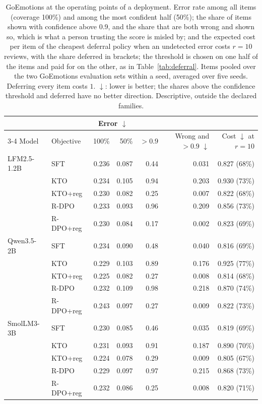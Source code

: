 \begin{table}[t]
\centering
\caption{GoEmotions at the operating points of a deployment. Error rate among all items (coverage 100\%) and among the most confident half (50\%); the share of items shown with confidence above 0.9, and the share that are both wrong and shown so, which is what a person trusting the score is misled by; and the expected cost per item of the cheapest deferral policy when an undetected error costs $r = 10$ reviews, with the share deferred in brackets; the threshold is chosen on one half of the items and paid for on the other, as in Table~\ref{tab:deferral}. Items pooled over the two GoEmotions evaluation sets within a seed, averaged over five seeds. Deferring every item costs $1$. $\downarrow$: lower is better; the shares above the confidence threshold and deferred have no better direction. Descriptive, outside the declared families.}
\label{tab:goemo-operating}
\footnotesize
\setlength{\tabcolsep}{4pt}
\begin{tabular}{llrrrrr}
\toprule
& & \multicolumn{2}{c}{Error $\downarrow$} & & & \\ \cmidrule(lr){3-4}
Model & Objective & 100\% & 50\% & $>0.9$ & Wrong and $>0.9$ $\downarrow$ & Cost $\downarrow$ at $r = 10$ \\
\midrule
LFM2.5-1.2B & SFT & 0.236 & 0.087 & 0.44 & 0.031 & 0.827 (68\%) \\
 & KTO & 0.234 & 0.105 & 0.94 & 0.203 & 0.930 (73\%) \\
 & KTO+reg & 0.230 & 0.082 & 0.25 & 0.007 & 0.822 (68\%) \\
 & R-DPO & 0.233 & 0.093 & 0.96 & 0.209 & 0.856 (73\%) \\
 & R-DPO+reg & 0.230 & 0.084 & 0.17 & 0.002 & 0.823 (69\%) \\
\addlinespace
Qwen3.5-2B & SFT & 0.234 & 0.090 & 0.48 & 0.040 & 0.816 (69\%) \\
 & KTO & 0.229 & 0.103 & 0.89 & 0.176 & 0.925 (77\%) \\
 & KTO+reg & 0.225 & 0.082 & 0.27 & 0.008 & 0.814 (68\%) \\
 & R-DPO & 0.232 & 0.109 & 0.98 & 0.218 & 0.870 (74\%) \\
 & R-DPO+reg & 0.243 & 0.097 & 0.27 & 0.009 & 0.822 (73\%) \\
\addlinespace
SmolLM3-3B & SFT & 0.230 & 0.085 & 0.46 & 0.035 & 0.819 (69\%) \\
 & KTO & 0.231 & 0.093 & 0.91 & 0.187 & 0.890 (70\%) \\
 & KTO+reg & 0.224 & 0.078 & 0.29 & 0.009 & 0.805 (67\%) \\
 & R-DPO & 0.229 & 0.097 & 0.97 & 0.215 & 0.868 (73\%) \\
 & R-DPO+reg & 0.232 & 0.086 & 0.25 & 0.008 & 0.820 (71\%) \\
\bottomrule
\end{tabular}
\end{table}
